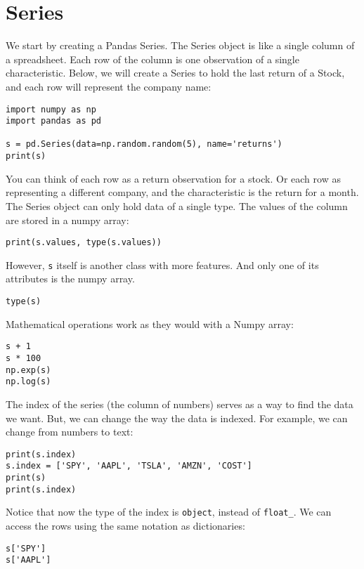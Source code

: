 \documentclass[12pt, a4paper]{article}
\begin{document}
\section{Series}
\label{sec:org2942f68}
We start by creating a Pandas Series.
The Series object is like a single column of a spreadsheet.
Each row of the column is one observation of a single characteristic.
Below, we will create a Series to hold the last return of a Stock, and each row will represent the company name:
\lstset{language=jupyter-python,label= ,caption= ,captionpos=b,numbers=none}
\begin{lstlisting}
import numpy as np
import pandas as pd

s = pd.Series(data=np.random.random(5), name='returns')
print(s)
\end{lstlisting}

You can think of each row as a return observation for a stock.
Or each row as representing a different company, and the characteristic is the return for a month.
The Series object can only hold data of a single type.
The values of the column are stored in a numpy array:
\lstset{language=jupyter-python,label= ,caption= ,captionpos=b,numbers=none}
\begin{lstlisting}
print(s.values, type(s.values))
\end{lstlisting}

However, \texttt{s} itself is another class with more features.
And only one of its attributes is the numpy array.
\lstset{language=jupyter-python,label= ,caption= ,captionpos=b,numbers=none}
\begin{lstlisting}
type(s)
\end{lstlisting}

Mathematical operations work as they would with a Numpy array:
\lstset{language=jupyter-python,label= ,caption= ,captionpos=b,numbers=none}
\begin{lstlisting}
s + 1
s * 100
np.exp(s)
np.log(s)
\end{lstlisting}

The index of the series (the column of numbers) serves as a way to find the data we want.
But, we can change the way the data is indexed.
For example, we can change from numbers to text:
\lstset{language=jupyter-python,label= ,caption= ,captionpos=b,numbers=none}
\begin{lstlisting}
print(s.index)
s.index = ['SPY', 'AAPL', 'TSLA', 'AMZN', 'COST']
print(s)
print(s.index)
\end{lstlisting}

Notice that now the type of the index is \texttt{object}, instead of \texttt{float\_}.
We can access the rows using the same notation as dictionaries:
\lstset{language=jupyter-python,label= ,caption= ,captionpos=b,numbers=none}
\begin{lstlisting}
s['SPY']
s['AAPL']
\end{lstlisting}
\end{document}
